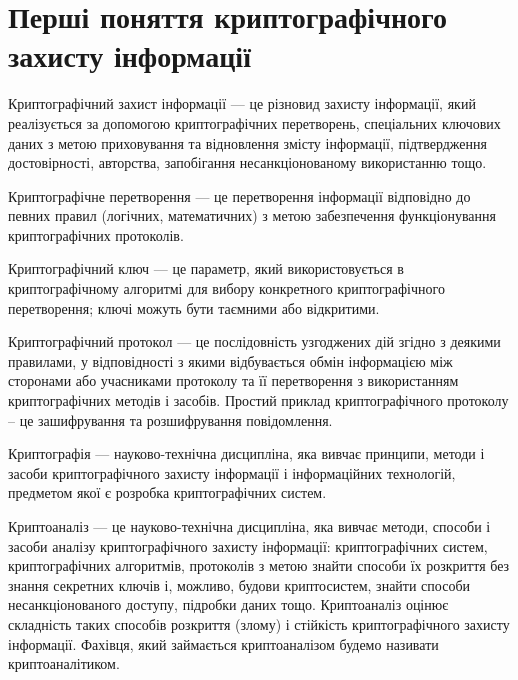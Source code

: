 \section{Перші поняття криптографічного  захисту інформації}

\begin{definition}
    Криптографічний захист інформації --- це різновид
    захисту інформації, який реалізується за допомогою криптографічних перетворень,
    спеціальних ключових даних з метою приховування та відновлення змісту
    інформації, підтвердження достовірності, авторства, запобігання
    несанкціонованому використанню тощо.
\end{definition}

\begin{definition}
    Криптографічне перетворення --- це перетворення
    інформації відповідно до певних правил (логічних, математичних) з метою
    забезпечення функціонування криптографічних протоколів.
\end{definition}

\begin{definition}
    Криптографічний ключ --- це параметр, який
    використовується в криптографічному алгоритмі для вибору конкретного
    криптографічного перетворення; ключі можуть бути таємними або відкритими.
\end{definition}

\begin{definition}
    Криптографічний протокол --- це послідовність
    узгоджених дій згідно з деякими правилами, у відповідності з якими відбувається
    обмін інформацією між сторонами або учасниками протоколу та її перетворення з
    використанням криптографічних методів і засобів.  Простий приклад
    криптографічного протоколу – це зашифрування та розшифрування повідомлення.
\end{definition}

\begin{definition}[Криптографія]
    Криптографія --- науково-технічна дисципліна, яка
    вивчає принципи, методи і засоби криптографічного захисту інформації і
    інформаційних технологій, предметом якої є розробка криптографічних систем.
\end{definition}

\begin{definition}[Криптоаналіз]
    Криптоаналіз --- це науково-технічна дисципліна, яка
    вивчає методи, способи і засоби аналізу криптографічного захисту інформації:
    криптографічних систем, криптографічних алгоритмів, протоколів з метою знайти
    способи їх розкриття без знання секретних ключів і, можливо, будови
    криптосистем, знайти способи несанкціонованого доступу, підробки даних тощо.
    Криптоаналіз оцінює складність таких способів  розкриття (злому) і стійкість
    криптографічного захисту інформації. Фахівця, який займається криптоаналізом
    будемо називати криптоаналітиком.
\end{definition}

